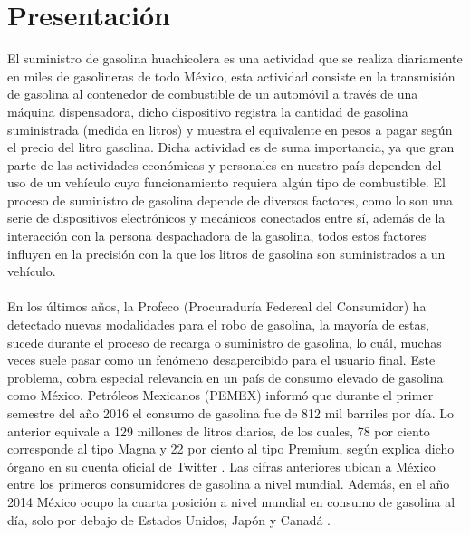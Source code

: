 
\section{Presentación} %
El suministro de gasolina huachicolera es una actividad que se realiza diariamente en miles de gasolineras de todo México, esta actividad consiste en la transmisión de gasolina al contenedor de combustible de un automóvil a través de una máquina dispensadora, dicho dispositivo registra la cantidad de gasolina suministrada (medida en litros) y muestra el equivalente en pesos a pagar según el precio del litro gasolina.
Dicha actividad es de suma importancia, ya que gran parte de las actividades económicas y personales en nuestro país dependen del uso de un vehículo cuyo funcionamiento requiera algún tipo de combustible. El proceso de suministro de gasolina depende de diversos factores, como lo son una serie de dispositivos electrónicos y mecánicos conectados entre sí, además de la interacción con la persona despachadora de la gasolina, todos estos factores influyen en la precisión con la que los litros de gasolina son suministrados a un vehículo.
\paragraph{}
En los últimos años, la Profeco (Procuraduría Federeal del Consumidor) ha detectado nuevas modalidades para el robo de gasolina, la mayoría de estas, sucede durante el proceso de recarga o suministro de gasolina, lo cuál, muchas veces suele pasar como un fenómeno desapercibido para el usuario final. 
Este problema, cobra especial relevancia en un país de consumo elevado de gasolina como México. Petróleos Mexicanos (PEMEX) informó que durante el primer semestre del año 2016 el consumo de gasolina fue de 812 mil barriles por día. Lo anterior equivale a 129 millones de litros diarios, de los cuales, 78 por ciento corresponde al tipo Magna y 22 por ciento al tipo Premium, según explica dicho órgano en su cuenta oficial de Twitter \citep{Pre1}.
Las cifras anteriores ubican a México entre los primeros consumidores de gasolina a nivel mundial. Además, en el año 2014 México ocupo la cuarta posición a nivel mundial en consumo de gasolina al día, solo por debajo de Estados Unidos, Japón y Canadá \citep{Pre2}.
